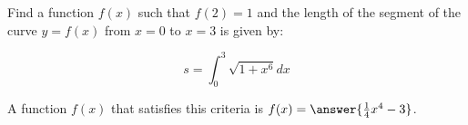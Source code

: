 \documentclass{ximera}
\author{Jim Talamo}
\begin{document}
\begin{exercise}

Find a function $f(x)$ such that $f(2)=1$ and the length of the segment of the curve $y=f(x)$ from $x=0$ to $x=3$ is given by:

\[
s= \int_0^3 \sqrt{1+x^6} dx
\]

A function $f(x)$ that satisfies this criteria is $f(x) = \answer{\frac{1}{4}x^4-3}$.


\end{exercise}
\end{document}
